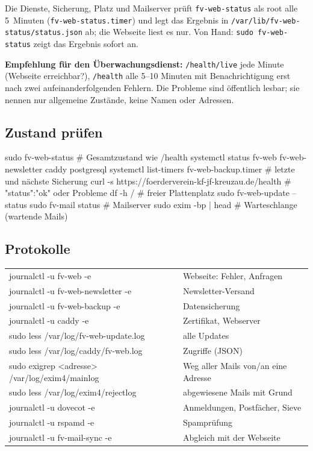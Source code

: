 \documentclass[a4paper,fontsize=10pt]{scrartcl}
\newcommand*{\cmd}[1]{\texttt{#1}}
\newcommand*{\pfad}[1]{\texttt{#1}}
\begin{document}
Die Dienste, Sicherung, Platz und Mailserver prüft \cmd{fv-web-status} als root alle
5~Minuten (\cmd{fv-web-status.timer}) und legt das Ergebnis in
\pfad{/var/lib/fv-web-status/status.json} ab; die Webseite liest es nur. Von Hand:
\cmd{sudo fv-web-status} zeigt das Ergebnis sofort an.

\textbf{Empfehlung für den Überwachungsdienst:} \cmd{/health/live} jede Minute
(Webseite erreichbar?), \cmd{/health} alle 5--10 Minuten mit Benachrichtigung erst
nach zwei aufeinanderfolgenden Fehlern. Die Probleme sind öffentlich lesbar; sie
nennen nur allgemeine Zustände, keine Namen oder Adressen.

\subsection{Zustand prüfen}

\begin{befehl}
sudo fv-web-status                             # Gesamtzustand wie /health
systemctl status fv-web fv-web-newsletter caddy postgresql
systemctl list-timers fv-web-backup.timer      # letzte und nächste Sicherung
curl -s https://foerderverein-kf-jf-kreuzau.de/health   # {"status":"ok"} oder Probleme
df -h /                                        # freier Plattenplatz
sudo fv-web-update --status
sudo fv-mail status                            # Mailserver
sudo exim -bp | head                           # Warteschlange (wartende Mails)
\end{befehl}

\subsection{Protokolle}

\begin{center}
\small
\begin{tabularx}{\textwidth}{@{}>{\ttfamily\raggedright}p{70mm}X@{}}
\toprule
journalctl -u fv-web -e              & Webseite: Fehler, Anfragen \\
journalctl -u fv-web-newsletter -e   & Newsletter-Versand \\
journalctl -u fv-web-backup -e       & Datensicherung \\
journalctl -u caddy -e               & Zertifikat, Webserver \\
sudo less /var/log/fv-web-update.log & alle Updates \\
sudo less /var/log/caddy/fv-web.log  & Zugriffe (JSON) \\
\midrule
sudo exigrep <adresse> /var/log/exim4/mainlog & Weg aller Mails von/an eine Adresse \\
sudo less /var/log/exim4/rejectlog   & abgewiesene Mails mit Grund \\
journalctl -u dovecot -e             & Anmeldungen, Postfächer, Sieve \\
journalctl -u rspamd -e              & Spamprüfung \\
journalctl -u fv-mail-sync -e        & Abgleich mit der Webseite \\
\bottomrule
\end{tabularx}
\end{center}
\end{document}
